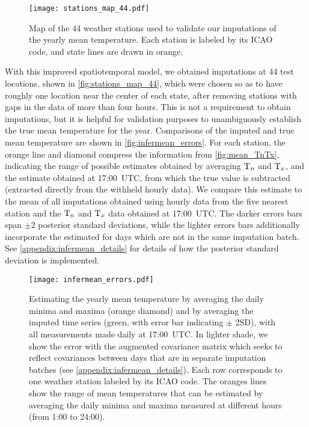 \begin{figure}[tb]
\centering
\texttt{[image: stations\_map\_44.pdf]}
\caption{\label{fig:stations_map_44}
Map of the 44 weather stations used to validate our imputations of the yearly mean temperature.
Each station is labeled by its ICAO code, and state lines are drawn in orange.}
\end{figure}

With this improved spatiotemporal model, we obtained imputations at 44 test locations,
shown in \autoref{fig:stations_map_44}, which were chosen so as to have roughly one location 
near the center of each state, after removing stations with gaps in the data of more than four hours.
This is not a requirement to obtain imputations, but it is helpful for validation purposes
to unambiguously establish the true mean temperature for the year.
Comparisons of the imputed and true mean temperature are shown in \autoref{fig:infermean_errors}.
For each station, the orange line and diamond compress the information from \autoref{fig:mean_TnTx},
indicating the range of possible estimates obtained by averaging $\mathrm{T}_{n}$ and $\mathrm{T}_{x}$, and the estimate
obtained at 17:00~UTC, from which the true value is subtracted (extracted directly from the withheld hourly data).
We compare this estimate to the mean of all imputations obtained using 
hourly data from the five nearest station and the $\mathrm{T}_{n}$ and $\mathrm{T}_{x}$ data obtained at 17:00~UTC.
The darker errors bars span $\pm 2$ posterior standard deviations,
while the lighter errors bars additionally incorporate the estimated for days
which are not in the same imputation batch.
See \autoref{appendix:infermean_details} for details of how the posterior standard deviation is implemented.

\begin{figure}[p]
    \centering
    \texttt{[image: infermean\_errors.pdf]}
    \caption{
        \label{fig:infermean_errors}
        Estimating the yearly mean temperature by averaging the daily minima and maxima (orange diamond)
        and by averaging the imputed time series (green, with error bar indicating $\pm$ 2SD),
        with all measurements made daily at 17:00\ UTC.
        In lighter shade, we show the error with the augmented covariance matrix
        which seeks to reflect covariances between days that are in
        separate imputation batches (see \autoref{appendix:infermean_details}).
        Each row corresponds to one weather station labeled by its ICAO code.
        The oranges lines show the range of mean temperatures that can be estimated by averaging the
        daily minima and maxima measured at different hours (from 1:00 to 24:00).
    }
\end{figure}

